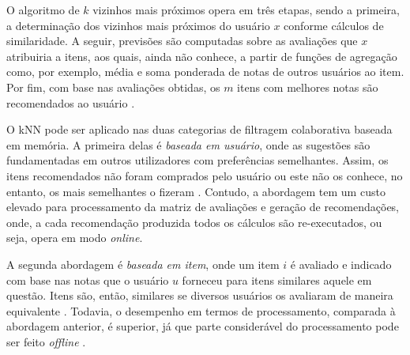                  
            O algoritmo de $k$ vizinhos mais próximos opera em três etapas, sendo a primeira, a determinação dos vizinhos mais próximos do usuário $x$ conforme cálculos de similaridade. A seguir, previsões são computadas sobre as avaliações que $x$ atribuiria a itens, aos quais, ainda não conhece, a partir de funções de agregação como, por exemplo, média e soma ponderada de notas de outros usuários ao item. Por fim, com base nas avaliações obtidas, os $m$ itens com melhores notas são recomendados ao usuário \cite{Bobadilla_2013}.
            
            
            O kNN pode ser aplicado nas duas categorias de filtragem colaborativa baseada em memória. A primeira delas é \textit{baseada em usuário}, onde as sugestões são fundamentadas em outros utilizadores com preferências semelhantes. Assim, os itens recomendados não foram comprados pelo usuário ou este não os conhece, no entanto, os mais semelhantes o fizeram \cite{Ricci2010}. Contudo, a abordagem tem um custo elevado para processamento da matriz de avaliações e geração de recomendações, onde, a cada recomendação produzida todos os cálculos são re-executados, ou seja, opera em modo \textit{online}.
            
            A segunda abordagem é \textit{baseada em item}, onde um item $i$ é avaliado e indicado com base nas notas que o usuário $u$ forneceu para itens similares aquele em questão. Itens são, então, similares se diversos usuários os avaliaram de maneira equivalente \cite{Ricci2010}. Todavia, o desempenho em termos de processamento, comparada à abordagem anterior, é superior, já que parte considerável do processamento pode ser feito \textit{offline} \cite{Jannach2010, Miranda2010}.
            
                        
    
